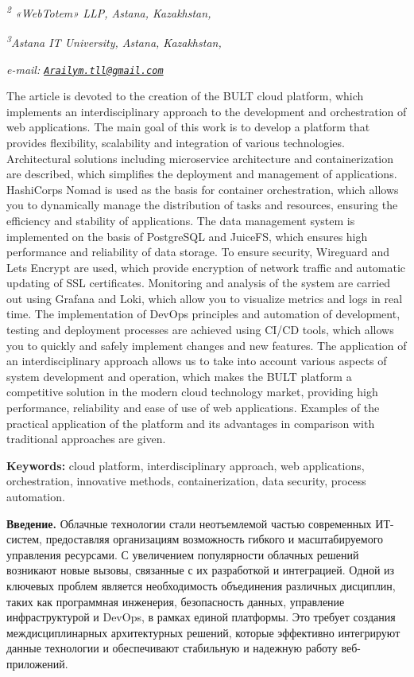 \documentclass[
]{article}
\begin{document}
\emph{\textsuperscript{2} «WebTotem» LLP, Astana, Kazakhstan,}

\emph{\textsuperscript{3}Astana IT University, Astana, Kazakhstan,}

\emph{e-mail:
\href{mailto:Arailym.tll@gmail.com}{\nolinkurl{Arailym.tll@gmail.com}}}

The article is devoted to the creation of the BULT cloud platform, which
implements an interdisciplinary approach to the development and
orchestration of web applications. The main goal of this work is to
develop a platform that provides flexibility, scalability and
integration of various technologies. Architectural solutions including
microservice architecture and containerization are described, which
simplifies the deployment and management of applications.
HashiCorp\textquotesingle s Nomad is used as the basis for container
orchestration, which allows you to dynamically manage the distribution
of tasks and resources, ensuring the efficiency and stability of
applications. The data management system is implemented on the basis of
PostgreSQL and JuiceFS, which ensures high performance and reliability
of data storage. To ensure security, Wireguard and Let\textquotesingle s
Encrypt are used, which provide encryption of network traffic and
automatic updating of SSL certificates. Monitoring and analysis of the
system are carried out using Grafana and Loki, which allow you to
visualize metrics and logs in real time. The implementation of DevOps
principles and automation of development, testing and deployment
processes are achieved using CI/CD tools, which allows you to quickly
and safely implement changes and new features. The application of an
interdisciplinary approach allows us to take into account various
aspects of system development and operation, which makes the BULT
platform a competitive solution in the modern cloud technology market,
providing high performance, reliability and ease of use of web
applications. Examples of the practical application of the platform and
its advantages in comparison with traditional approaches are given.

\textbf{Keywords:} cloud platform, interdisciplinary approach, web
applications, orchestration, innovative methods, containerization, data
security, process automation.

\textbf{Введение.} Облачные технологии стали неотъемлемой частью
современных ИТ-систем, предоставляя организациям возможность гибкого и
масштабируемого управления ресурсами. С увеличением популярности
облачных решений возникают новые вызовы, связанные с их разработкой и
интеграцией. Одной из ключевых проблем является необходимость
объединения различных дисциплин, таких как программная инженерия,
безопасность данных, управление инфраструктурой и DevOps, в рамках
единой платформы. Это требует создания междисциплинарных архитектурных
решений, которые эффективно интегрируют данные технологии и обеспечивают
стабильную и надежную работу веб-приложений.
\end{document}
